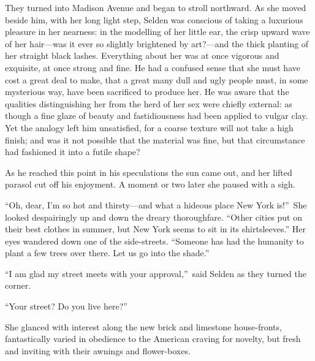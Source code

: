 \documentclass[12pt,a4paper]{book}
\begin{document}
They turned into Madison Avenue and began to stroll northward. As
she moved beside him, with her long light step, Selden was
conscious of taking a luxurious pleasure in her nearness: in the
modelling of her little ear, the crisp upward wave of her
hair---was it ever so slightly brightened by art?---and the thick
planting of her straight black lashes. Everything about her was
at once vigorous and exquisite, at once strong and fine. He had a
confused sense that she must have cost a great deal to make, that
a great many dull and ugly people must, in some mysterious way,
have been sacrificed to produce her. He was aware that the
qualities distinguishing her from the herd of her sex were
chiefly external: as though a fine glaze of beauty and
fastidiousness had been applied to vulgar clay. Yet the analogy
left him unsatisfied, for a coarse texture will not take a high
finish; and was it not possible that the material was fine, but
that circumstance had fashioned it into a futile shape?





As he reached this point in his speculations the sun came out,
and her lifted parasol cut off his enjoyment. A moment or two
later she paused with a sigh.





``Oh, dear, I'm so hot and thirsty---and what a hideous place New
York is!''\ She looked despairingly up and down the dreary
thoroughfare. ``Other cities put on their best clothes in summer,
but New York seems to sit in its shirtsleeves.'' Her eyes wandered
down one of the side-streets. ``Someone has had the humanity to
plant a few trees over there. Let us go into the shade.''





``I am glad my street meets with your approval,''\ said Selden as
they turned the corner.





``Your street? Do you live here?''





She glanced with interest along the new brick and limestone
house-fronts, fantastically varied in obedience to the American
craving for novelty, but fresh and inviting with their awnings
and flower-boxes.
\end{document}

